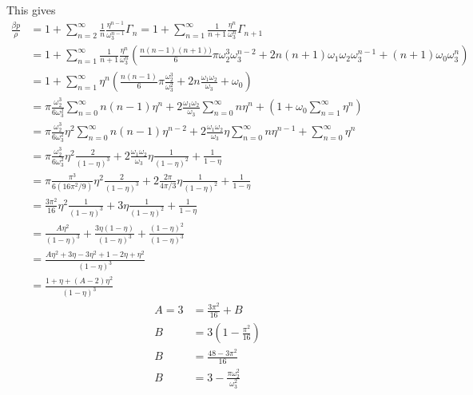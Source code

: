 \documentclass[12pt]{report}
\begin{document}
This gives
\begin{equation}
  \begin{split}
    \frac{\beta p}{\rho} &=
    1 + \sum_{n=2}^\infty \frac{1}{n} \frac{\eta^{n-1}}{\omega_3^{n-1}} \Gamma_n
    =
    1 + \sum_{n=1}^\infty \frac{1}{n+1} \frac{\eta^n}{\omega_3^n} \Gamma_{n+1}
    \\ &=
    1 + \sum_{n=1}^\infty \frac{1}{n+1} \frac{\eta^n}{\omega_3^n}
    \left(
    \frac{n(n-1)(n+1))}{6} \pi \omega_2^3 \omega_3^{n-2} +
    2 n(n+1) \omega_1 \omega_2 \omega_3^{n-1} +
    (n+1) \omega_0 \omega_3^{n}
    \right)
    \\ &=
    1 + \sum_{n=1}^\infty \eta^n
    \left(
    \frac{n(n-1)}{6} \pi \frac{\omega_2^3}{\omega_3^2} +
    2 n \frac{\omega_1 \omega_2}{\omega_3} +
    \omega_0
    \right)
    \\ &=
    \pi \frac{\omega_2^3}{6\omega_3^2}
    \sum_{n=0}^\infty
    n(n-1) \eta^n
    +
    2 \frac{\omega_1 \omega_2}{\omega_3}
    \sum_{n=0}^\infty n \eta^n
    +
    \left( 1 + \omega_0 \sum_{n=1}^\infty \eta^n \right)
    \\ &=
    \pi \frac{\omega_2^3}{6\omega_3^2}
    \eta^2
    \sum_{n=0}^\infty
    n(n-1) \eta^{n-2}
    +
    2 \frac{\omega_1 \omega_2}{\omega_3}
    \eta
    \sum_{n=0}^\infty n \eta^{n-1}
    +
    \sum_{n=0}^\infty \eta^n
    \\ &=
    \pi \frac{\omega_2^3}{6\omega_3^2}
    \eta^2
    \frac{2}{(1-\eta)^3}
    +
    2 \frac{\omega_1 \omega_2}{\omega_3}
    \eta
    \frac{1}{(1-\eta)^2}
    +
    \frac{1}{1-\eta}
    \\ &=
    \pi \frac{\pi^3}{6 (16 \pi^2 / 9)}
    \eta^2
    \frac{2}{(1-\eta)^3}
    +
    2 \frac{2 \pi}{4 \pi / 3}
    \eta
    \frac{1}{(1-\eta)^2}
    +
    \frac{1}{1-\eta}
    \\ &=
    \frac{3 \pi^2}{16}
    \eta^2
    \frac{1}{(1-\eta)^3}
    +
    3
    \eta
    \frac{1}{(1-\eta)^2}
    +
    \frac{1}{1-\eta}
    \\ &=
    \frac{A\eta^2}{(1-\eta)^3}
    +
    \frac{3\eta (1-\eta)}{(1-\eta)^3}
    +
    \frac{(1-\eta)^2}{(1-\eta)^3}
    \\ &=
    \frac{A \eta^2
    +
    3\eta - 3\eta^2
    +
    1-2\eta + \eta^2}{(1-\eta)^3}
    \\ &=
    \frac{1 + \eta + (A - 2) \eta^2}{(1-\eta)^3}
  \end{split}
\end{equation}
\begin{align*}
  A = 3 &= \frac{3\pi^2}{16} + B \\
  B &= 3\left( 1 - \frac{\pi^2}{16} \right) \\
  B &= \frac{48 - 3\pi^2}{16} \\
  B &= 3 - \frac{\pi \omega_2^2}{\omega_3^2} \\
\end{align*}
\end{document}
